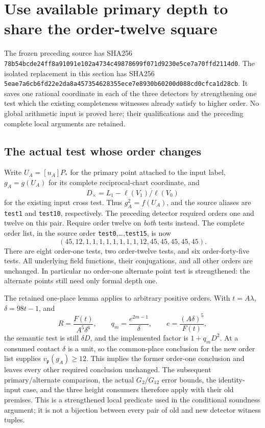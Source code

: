 \section{Use available primary depth to share the order-twelve square}

The frozen preceding source has SHA256
\texttt{78b54bcde24ff8a91091e102a4734c49878699f071d9230e5ce7a70ffd2114d0}.
The isolated replacement in this section has SHA256
\texttt{5eae7a6cb6fd22e2da8a457354628355ece7e8930b60200d088cd0cfca1d28cb}.
It saves one rational coordinate in each of the three detectors by
strengthening one test which the existing completeness witnesses already
satisfy to higher order. No global arithmetic input is proved here; their
qualifications and the preceding complete local arguments are retained.

\subsection{The actual test whose order changes}

Write $U_A=[u_A]P_*$ for the primary point attached to the input label,
$g_A=g(U_A)$ for its complete reciprocal-chart coordinate, and
\[
 D_{\times}=L_1-\overline{\ell(V_1)/\ell(V_0)}
\]
for the existing input cross test. Thus $g_A^2=f(U_A)$, and the source
aliases are \texttt{test1} and \texttt{test10}, respectively. The
preceding detector required orders one and twelve on this pair. Require
order twelve on \emph{both} tests instead. The complete order list, in
the source order \texttt{test0},\ldots,\texttt{test15}, is now
\[
 (45,12,1,1,1,1,1,1,1,1,12,45,45,45,45,45).
\]
There are eight order-one tests, two order-twelve tests, and six
order-forty-five tests. All underlying field functions, their conjugations,
and all other orders are unchanged. In particular no order-one alternate
point test is strengthened: the alternate points still need only formal
depth one.

The retained one-place lemma applies to arbitrary positive orders.
With $t=A\lambda$, $\delta=98t-1$, and
\[
 R=\frac{F(t)}{A^5\delta^6},\qquad
 q_m=\frac{e^{2m-1}}{\delta},\qquad
 e=\frac{(A\delta)^5}{F(t)},
\]
the semantic test is still $\delta D$, and the implemented factor is
$1+q_mD^2$. At a consumed contact $\delta$ is a unit, so the common-place
conclusion for the new order list supplies $v_{\mathfrak p}(g_A)\ge12$.
This implies the former order-one conclusion and leaves every other
required conclusion unchanged. The subsequent primary/alternate
comparison, the actual $G_2/G_{12}$ error bounds, the identity-input case,
and the three height consumers therefore apply with their old premises.
This is a strengthened local predicate used in the conditional soundness
argument; it is not a bijection between every pair of old and new detector
witness tuples.

